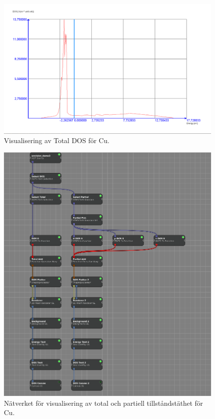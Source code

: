 \documentclass[a4paper,12pt]{article}
\begin{document}
\begin{figure}[H]
    \centering
    \includegraphics[scale=0.30]{screenshot_total_dos_Cu_1_10.png}
    \caption{Visualisering av Total DOS för Cu.}
    \label{fig:total_dos}
\end{figure}

\begin{figure}[H]
    \centering
    \includegraphics[scale=0.35]{screenshot_dos_network_Cu_1_10.png}
    \caption{Nätverket för visualisering av total och partiell tillståndstäthet för Cu.}
    \label{fig:network_dos}
\end{figure}
\end{document}
